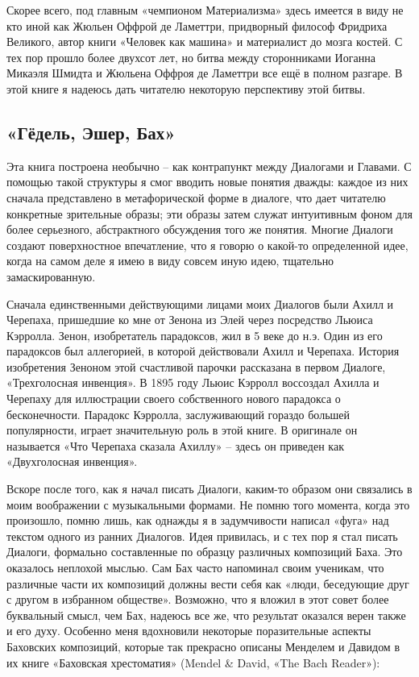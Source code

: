 \documentclass[../main.tex]{subfiles}
\begin{document}
Скорее всего, под главным «чемпионом Материализма» здесь имеется в виду не кто иной как Жюльен Оффрой де Ламеттри, придворный философ Фридриха Великого, автор книги «Человек как машина» и материалист до мозга костей. С тех пор прошло более двухсот лет, но битва между сторонниками Иоганна Микаэля Шмидта и Жюльена Оффроя де Ламеттри все ещё в полном разгаре. В этой книге я надеюсь дать читателю некоторую перспективу этой битвы.


\subsection{«Гёдель, Эшер, Бах»}

Эта книга построена необычно \--- как контрапункт между Диалогами и Главами. С помощью такой структуры я смог вводить новые понятия дважды: каждое из них сначала представлено в метафорической форме в диалоге, что дает читателю конкретные зрительные образы; эти образы затем служат интуитивным фоном для более серьезного, абстрактного обсуждения того же понятия. Многие Диалоги создают поверхностное впечатление, что я говорю о какой-то определенной идее, когда на самом деле я имею в виду совсем иную идею, тщательно замаскированную.

Сначала единственными действующими лицами моих Диалогов были Ахилл и Черепаха, пришедшие ко мне от Зенона из Элей через посредство Льюиса Кэрролла. Зенон, изобретатель парадоксов, жил в 5 веке до н.э. Один из его парадоксов был аллегорией, в которой действовали Ахилл и Черепаха. История изобретения Зеноном этой счастливой парочки рассказана в первом Диалоге, «Трехголосная инвенция». В 1895 году Льюис Кэрролл воссоздал Ахилла и Черепаху для иллюстрации своего собственного нового парадокса о бесконечности. Парадокс Кэрролла, заслуживающий гораздо большей популярности, играет значительную роль в этой книге. В оригинале он называется «Что Черепаха сказала Ахиллу» \--- здесь он приведен как «Двухголосная инвенция».

Вскоре после того, как я начал писать Диалоги, каким-то образом они связались в моим воображении с музыкальными формами. Не помню того момента, когда это произошло, помню лишь, как однажды я в задумчивости написал «фуга» над текстом одного из ранних Диалогов. Идея привилась, и с тех пор я стал писать Диалоги, формально составленные по образцу различных композиций Баха. Это оказалось неплохой мыслью. Сам Бах часто напоминал своим ученикам, что различные части их композиций должны вести себя как «люди, беседующие друг с другом в избранном обществе». Возможно, что я вложил в этот совет более буквальный смысл, чем Бах, надеюсь все же, что результат оказался верен также и его духу. Особенно меня вдохновили некоторые поразительные аспекты Баховских композиций, которые так прекрасно описаны Менделем и Давидом в их книге «Баховская хрестоматия» (Mendel \& David, «The Bach Reader»):
\end{document}
